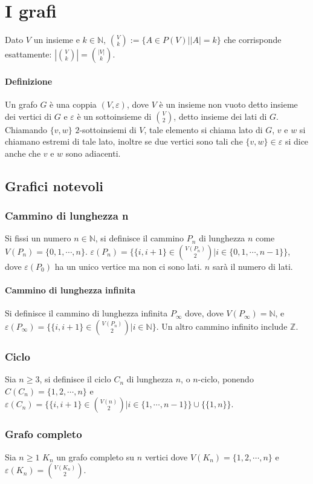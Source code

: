 \chapter{I grafi}
Dato $V$ un insieme e $k\in\mathbb{N}$, $\binom{V}{k}:=\{A\in P(V)||A|=k\}$ che corrisponde esattamente: $|\binom{V}{k}|=\binom{|V|}{k}$.
\subsubsection{Definizione}
Un grafo $G$ \`e una coppia $(V,\varepsilon)$, dove $V$ \`e un insieme non vuoto detto insieme dei vertici di $G$ e $\varepsilon$ \`e un sottoinsieme di $\binom{V}{2}$, detto 
insieme dei lati di $G$. Chiamando $\{v,w\}$ $2$-sottoinsiemi di $V$, tale elemento si chiama lato di $G$, $v$ e $w$ si chiamano estremi di tale lato, 
inoltre se due vertici sono tali che $\{v,w\}\in\varepsilon$ si dice anche che $v$ e $w$ sono adiacenti. 
\section{Grafici notevoli}
\subsection{Cammino di lunghezza n}
Si fissi un numero $n\in\mathbb{N}$, si definisce il cammino $P_n$ di lunghezza $n$ come $V(P_n)=\{0,1,\cdots, n\}$. $\varepsilon(P_n)=\{\{i,i+1\}\in\binom{V(P_n)}{2}|i\in
\{0,1,\cdots, n-1\}\}$, dove $\varepsilon(P_0)$ ha un unico vertice ma non ci sono lati. $n$ sar\`a il numero di lati. 
\subsubsection{Cammino di lunghezza infinita}
Si definisce il cammino di lunghezza infinita $P_\infty$ dove, dove $V(P_\infty)=\mathbb{N}$, e $\varepsilon(P_\infty)=\{\{i,i+1\}\in\binom{V(P_n)}{2}|i\in\mathbb{N}\}$. Un 
altro cammino infinito include $\mathbb{Z}$. 
\subsection{Ciclo}
Sia $n\ge 3$, si definisce il ciclo $C_n$ di lunghezza $n$, o $n$-ciclo, ponendo $C(C_n)=\{1,2,\cdots, n\}$ e $\varepsilon(C_n)=\{\{i,i+1\}\in\binom{V(n)}{2}|i\in\{1,\cdots, 
n-1\}\}\cup \{\{1,n\}\}$.
\subsection{Grafo completo}
Sia $n\ge 1$ $K_n$ un grafo completo su $n$ vertici dove $V(K_n)=\{1,2,\cdots, n\}$ e $\varepsilon(K_n)=\binom{V(K_n)}{2}$.
